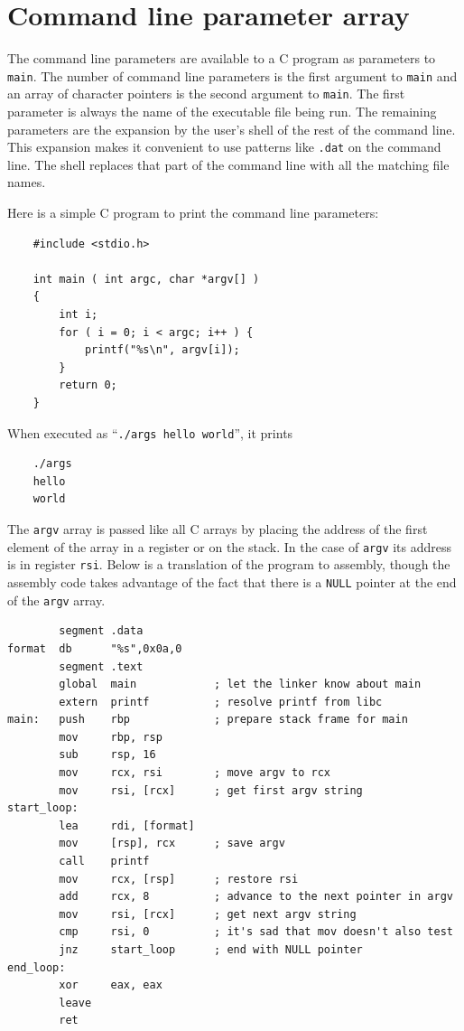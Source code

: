 \documentclass[11pt,b5paper]{book}
\begin{document}
\section{Command line parameter array}

The command line parameters are available to a C program as parameters to {\tt main}. 
The number of command line parameters is the first argument to {\tt main} and an array
of character pointers is the second argument to {\tt main}.
The first parameter is always the name of the executable file being run.
The remaining parameters are the expansion by the user's shell of the rest of the command line.
This expansion makes it convenient to use patterns like {\tt *.dat} on the command line.
The shell replaces that part of the command line with all the matching file names.

Here is a simple C program to print the command line parameters:
\begin{verbatim}
    #include <stdio.h>

    int main ( int argc, char *argv[] )
    {
        int i;
        for ( i = 0; i < argc; i++ ) {
            printf("%s\n", argv[i]);
        }
        return 0;
    }
\end{verbatim}

When executed as ``{\tt ./args hello world}'', it prints
\begin{verbatim}
    ./args
    hello
    world
\end{verbatim}

The {\tt argv} array is passed like all C arrays by placing the address of the first element
of the array in a register or on the stack.
In the case of {\tt argv} its address is in register {\tt rsi}.
Below is a translation of the program to assembly, though the assembly code takes advantage of the
fact that there is a {\tt NULL} pointer at the end of the {\tt argv} array.
\begin{verbatim}
        segment .data
format  db      "%s",0x0a,0
        segment .text
        global  main            ; let the linker know about main
        extern  printf          ; resolve printf from libc
main:   push    rbp             ; prepare stack frame for main
        mov     rbp, rsp
        sub     rsp, 16
        mov     rcx, rsi        ; move argv to rcx
        mov     rsi, [rcx]      ; get first argv string
start_loop:   
        lea     rdi, [format]
        mov     [rsp], rcx      ; save argv
        call    printf
        mov     rcx, [rsp]      ; restore rsi
        add     rcx, 8          ; advance to the next pointer in argv
        mov     rsi, [rcx]      ; get next argv string
        cmp     rsi, 0          ; it's sad that mov doesn't also test
        jnz     start_loop      ; end with NULL pointer
end_loop:
        xor     eax, eax
        leave
        ret
\end{verbatim}
\end{document}
